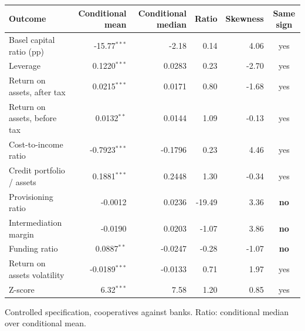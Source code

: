 \small
\setlength{\tabcolsep}{4pt}
\begin{tabular}{lrrrrc}
\toprule
Outcome & Conditional mean & Conditional median & Ratio & Skewness & Same sign \\
\midrule
Basel capital ratio (pp) & -15.77$^{***}$ & -2.18 & 0.14 & 4.06 & yes \\
Leverage & 0.1220$^{***}$ & 0.0283 & 0.23 & -2.70 & yes \\
Return on assets, after tax & 0.0215$^{***}$ & 0.0171 & 0.80 & -1.68 & yes \\
Return on assets, before tax & 0.0132$^{**}$ & 0.0144 & 1.09 & -0.13 & yes \\
Cost-to-income ratio & -0.7923$^{***}$ & -0.1796 & 0.23 & 4.46 & yes \\
Credit portfolio / assets & 0.1881$^{***}$ & 0.2448 & 1.30 & -0.34 & yes \\
Provisioning ratio & -0.0012 & 0.0236 & -19.49 & 3.36 & \textbf{no} \\
Intermediation margin & -0.0190 & 0.0203 & -1.07 & 3.86 & \textbf{no} \\
Funding ratio & 0.0887$^{**}$ & -0.0247 & -0.28 & -1.07 & \textbf{no} \\
\midrule
Return on assets volatility & -0.0189$^{***}$ & -0.0133 & 0.71 & 1.97 & yes \\
Z-score & 6.32$^{***}$ & 7.58 & 1.20 & 0.85 & yes \\
\bottomrule
\end{tabular}
\begin{tablenotes}[flushleft]\footnotesize
\item Controlled specification, cooperatives against banks. Ratio: conditional median over conditional mean.
\end{tablenotes}
